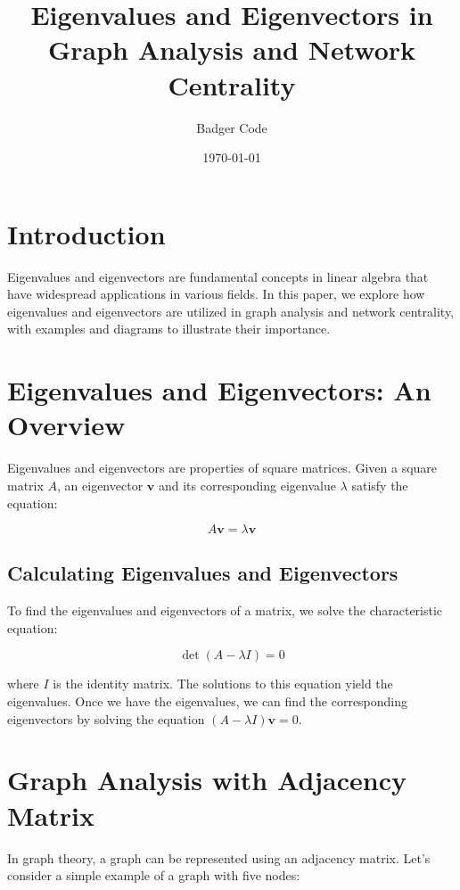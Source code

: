 \documentclass{article}
\begin{document}
\title{Eigenvalues and Eigenvectors in Graph Analysis and Network Centrality}
\author{Badger Code}
\date{\today}
\maketitle

\section{Introduction}

Eigenvalues and eigenvectors are fundamental concepts in linear algebra that have widespread applications in various fields. In this paper, we explore how eigenvalues and eigenvectors are utilized in graph analysis and network centrality, with examples and diagrams to illustrate their importance.

\section{Eigenvalues and Eigenvectors: An Overview}

Eigenvalues and eigenvectors are properties of square matrices. Given a square matrix $A$, an eigenvector $\mathbf{v}$ and its corresponding eigenvalue $\lambda$ satisfy the equation:

\[ A\mathbf{v} = \lambda\mathbf{v} \]

\subsection{Calculating Eigenvalues and Eigenvectors}

To find the eigenvalues and eigenvectors of a matrix, we solve the characteristic equation:

\[ \det(A - \lambda I) = 0 \]

where $I$ is the identity matrix. The solutions to this equation yield the eigenvalues. Once we have the eigenvalues, we can find the corresponding eigenvectors by solving the equation $(A - \lambda I)\mathbf{v} = 0$.

\section{Graph Analysis with Adjacency Matrix}

In graph theory, a graph can be represented using an adjacency matrix. Let's consider a simple example of a graph with five nodes:
\end{document}
